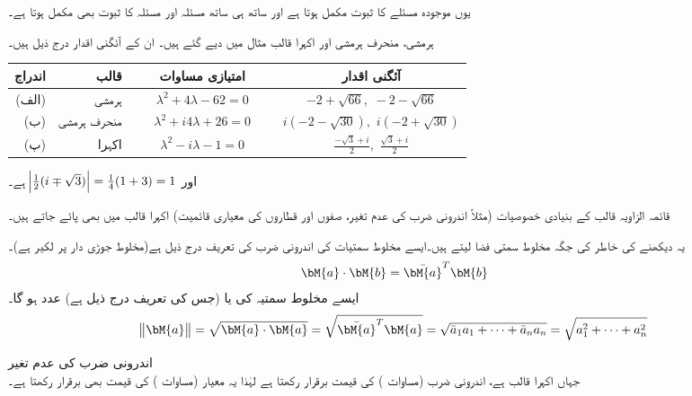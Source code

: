 یوں موجودہ مسئلے کا ثبوت مکمل ہوتا ہے اور ساتھ ہی ساتھ مسئلہ  اور مسئلہ  کا ثبوت بھی مکمل ہوتا ہے۔

ہرمشی، منحرف ہرمشی اور اکہرا قالب مثال  میں دیے گئے ہیں۔ ان کے آئگنی اقدار درج ذیل ہیں۔\\
\FloatBarrier
%
\begin{table}
\centering
\begin{tabular}{rrcc}
اندراج& قالب& امتیازی مساوات& آئگنی اقدار\\
\hline
(الف)& ہرمشی&
$\phantom{xxx}\lambda^2+4\lambda-62=0\phantom{xxx}$ & $-2+\sqrt{66},\,\,-2-\sqrt{66}$\Tstrut\Bstrut\\
(ب)& منحرف ہرمشی&
$\lambda^2+i4\lambda+26=0$ & $i(-2-\sqrt{30}),\,\, i(-2+\sqrt{30})$\\
(پ)& اکہرا&
$\lambda^2-i\lambda-1=0$ & $\frac{-\sqrt{3}+i}{2},\,\,\frac{\sqrt{3}+i}{2}$
\end{tabular}
\end{table}

\FloatBarrier
اور
$\abs{\tfrac{1}{2}(i\mp\sqrt{3})}=\tfrac{1}{4}(1+3)=1$
ہے۔

قائمہ الزاویہ قالب کے بنیادی خصوصیات (مثلاً اندرونی ضرب کی عدم تغیر، صفوں اور قطاروں کی معیاری قائمیت) اکہرا قالب میں بھی پائے جاتے ہیں۔ 

یہ دیکھنے کی خاطر   کی جگہ مخلوط سمتی فضا  لیتے ہیں۔ایسے مخلوط سمتیات کی اندرونی ضرب کی تعریف درج ذیل ہے(مخلوط جوڑی دار پر لکیر ہے)۔
\begin{align}\label{مساوات_آئگنی_اندرونی_ضرب_مخلوط}
\bM{a}\cdot \bM{b}=\bar{\bM{a}}^T\bM{b}
\end{align}
ایسے  مخلوط سمتیہ کی  یا  (جس کی تعریف درج ذیل ہے)   عدد ہو گا۔ 
\begin{align}\label{مساوات_آئگنی_معیار_مخلوط}
\norm{\bM{a}}=\sqrt{\bM{a}\cdot\bM{a}}=\sqrt{\bar{\bM{a}}^T\bM{a}}=\sqrt{\bar{a}_1a_1+\cdots+\bar{a}_na_n}=\sqrt{a_1^2+\cdots+a_n^2}
\end{align}

\quad اندرونی ضرب کی عدم تغیر\\
  جہاں  اکہرا قالب ہے، اندرونی ضرب (مساوات ) کی قیمت برقرار رکھتا ہے لہٰذا یہ معیار (مساوات ) کی قیمت بھی برقرار رکھتا ہے۔

